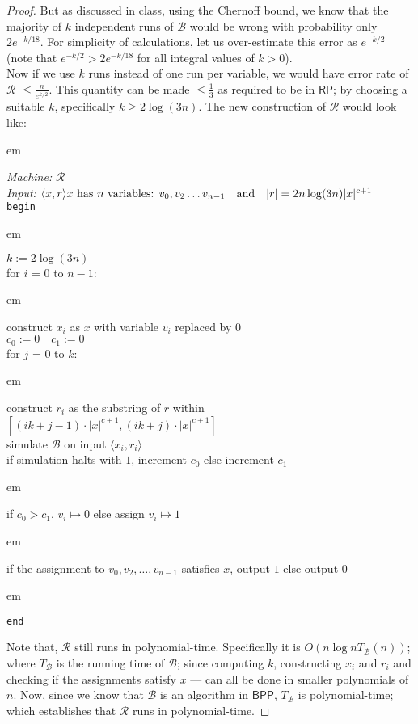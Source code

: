 \documentclass[usletter]{article}
\newcommand {\machine}[1]      {\ensuremath{\mathscr{#1}}}
\newcommand {\family}[1]       {\ensuremath{\mathsf{#1}}}
\newcommand {\indpar}[1]   {
  \par\leftskip=#1em
  \noindent\ignorespaces
}
\newenvironment{turing}[2] {
  \smallskip
  \indpar{2}
  \textit{Machine:} #1\\
  \textit{Input:} $#2$\\[5pt]
  \texttt{begin}
  \parskip=0pt
  \indpar{3}
}{
  \indpar{2}
  \texttt{end}
  \par\medskip
}
\newcommand {\RP}     {\family{RP}}
\newcommand {\BPP}    {\family{BPP}}
\begin{document}
\begin{enumerate}[labelsep=2.5em, label=\textbf{\arabic{enumi}}]
\begin{proof}
    But as discussed in class, using the Chernoff bound, we know that the
    majority of $k$ independent runs of \machine{B} would be wrong with
    probability only $2e^{-k/18}$. For simplicity of calculations, let us
    over-estimate this error as $e^{-k/2}$ (note that $e^{-k/2} > 2e^{-k/18}$
    for all integral values of $k > 0$).\\
    Now if we use $k$ runs instead of one run per variable, we would have error
    rate of \machine{R} $\leq \frac{n}{e^{k/2}}$. This quantity can be made
    $\leq \frac{1}{3}$ as required to be in \RP; by choosing a suitable $k$,
    specifically $k \geq 2\log(3n)$. The new construction of \machine{R}
    would look like:
    \begin{turing}
          {\machine{R}}
          {\langle x, r \rangle
            \hfill x \text{ has } n \text{ variables: } v_0, v_2 \ldots v_{n-1}
            \quad \text{and} \quad |r| = 2n\log(3n)|x|^{c+1}}
      $k := 2\log(3n)$ \\
      for $i$ = $0$ to $n-1$:
        \indpar{4}
        construct $x_i$ as $x$ with variable $v_i$ replaced by $0$ \\
        $c_0 := 0 \quad c_1 := 0$ \\
        for $j$ = $0$ to $k$:
          \indpar{5}
          construct $r_i$ as the substring of $r$ within
            $[(ik+j-1) \cdot |x|^{c+1}, (ik+j) \cdot |x|^{c+1}]$ \\
          simulate \machine{B} on input $\langle x_i, r_i \rangle$ \\
          if simulation halts with $1$, increment $c_0$ else increment $c_1$
        \indpar{4}
        if $c_0 > c_1$, $v_i \mapsto 0$ else assign $v_i \mapsto 1$
      \indpar{3}
      if the assignment to $v_0, v_2, \ldots , v_{n-1}$ satisfies $x$,
        output $1$ else output $0$
    \end{turing}

    Note that, \machine{R} still runs in polynomial-time. Specifically it is
    $O(n\log{n}T_\machine{B}(n))$; where $T_\machine{B}$ is the running time of
    \machine{B}; since computing $k$, constructing $x_i$ and $r_i$ and checking
    if the assignments satisfy $x$ --- can all be done in smaller polynomials of
    $n$. Now, since we know that \machine{B} is an algorithm in \BPP,
    $T_\machine{B}$ is polynomial-time; which establishes that \machine{R} runs
    in polynomial-time.


\end{proof}
\end{enumerate}
\end{document}
